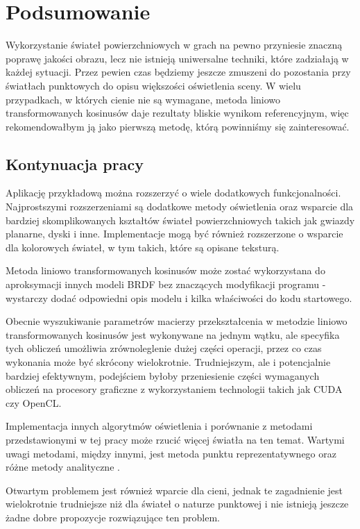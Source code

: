 \documentclass[../main.tex]{subfiles}
\begin{document}
\chapter{Podsumowanie}

Wykorzystanie świateł powierzchniowych w grach na pewno przyniesie znaczną poprawę jakości obrazu, lecz nie istnieją uniwersalne techniki, które zadziałają w każdej sytuacji. Przez pewien czas będziemy jeszcze zmuszeni do pozostania przy światłach punktowych do opisu większości oświetlenia sceny. W wielu przypadkach, w których cienie nie są wymagane, metoda liniowo transformowanych kosinusów daje rezultaty bliskie wynikom referencyjnym, więc rekomendowałbym ją jako pierwszą metodę, którą powinniśmy się zainteresować.

\section{Kontynuacja pracy}

Aplikację przykładową można rozszerzyć o wiele dodatkowych funkcjonalności. Najprostszymi rozszerzeniami są dodatkowe metody oświetlenia oraz wsparcie dla bardziej skomplikowanych kształtów świateł powierzchniowych takich jak gwiazdy planarne, dyski i inne. Implementacje mogą być również rozszerzone o wsparcie dla kolorowych świateł, w tym takich, które są opisane teksturą.

Metoda liniowo transformowanych kosinusów może zostać wykorzystana do aproksymacji innych modeli BRDF bez znaczących modyfikacji programu - wystarczy dodać odpowiedni opis modelu i kilka właściwości do kodu startowego.

Obecnie wyszukiwanie parametrów macierzy przekształcenia w metodzie liniowo transformowanych kosinusów jest wykonywane na jednym wątku, ale specyfika tych obliczeń umożliwia zrównoleglenie dużej części operacji, przez co czas wykonania może być skrócony wielokrotnie. Trudniejszym, ale i potencjalnie bardziej efektywnym, podejściem byłoby przeniesienie części wymaganych obliczeń na procesory graficzne z wykorzystaniem technologii takich jak CUDA czy OpenCL.

Implementacja innych algorytmów oświetlenia i porównanie z metodami przedstawionymi w tej pracy może rzucić więcej światła na ten temat. Wartymi uwagi metodami, między innymi, jest metoda punktu reprezentatywnego \cite{pbr_ue4, Drobot} oraz różne metody analityczne \cite{Snyder, LecoqAnalyticApproximationsForALS}.

Otwartym problemem jest również wparcie dla cieni, jednak te zagadnienie jest wielokrotnie trudniejsze niż dla świateł o naturze punktowej i nie istnieją jeszcze żadne dobre propozycje rozwiązujące ten problem.
\end{document}
